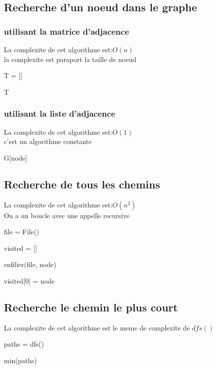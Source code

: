 \documentclass{report}
\begin{document}
\subsection{Recherche d'un noeud dans le graphe}
\subsubsection{utilisant la matrice d'adjacence}
La complexite de cet algorithme est:\(O(n)\)\\
la complexite est paraport la taille de noeud
\begin{algorithm}
T = []

\Return T
\caption{}
\end{algorithm}

\subsubsection{utilisant la liste d'adjacence}
La complexite de cet algorithme est:\(O(1)\)\\
c'est un algorithme constante
\begin{algorithm}
\Return G[node]
\caption{}
\end{algorithm}

\subsection{Recherche de tous les chemins}
La complexite de cet algorithme est:\(O(n^{2})\)\\
On a un boucle avec une appelle recursive
\begin{algorithm}
file = File()

visited = []

enfilier(file, node)

visited[0] = node

\caption{}
\end{algorithm}
\newpage

\subsection{Recherche le chemin le plus court}
La complexite de cet algorithme est le meme de complexite de \(dfs()\)
\begin{algorithm}
paths = dfs()

\Return min(paths)
\caption{}
\end{algorithm}
\end{document}
